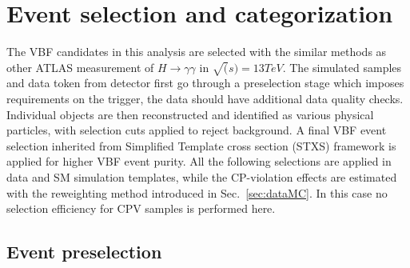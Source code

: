 \section{Event selection and categorization}
\label{sec:sel}

The VBF candidates in this analysis are selected with the similar methods as other ATLAS measurement of $H\to\gamma\gamma$ in $\sqrt(s)=13TeV$. The simulated samples and data token from detector first go through a preselection stage which imposes requirements on the trigger, the data should have additional data quality checks. Individual objects are then reconstructed and identified as various physical particles, with selection cuts applied to reject background. A final VBF event selection inherited from Simplified Template cross section (STXS) framework is applied for higher VBF event purity. All the following selections are applied in data and SM simulation templates, while the CP-violation effects are estimated with the reweighting method introduced in Sec.~\ref{sec:dataMC}. In this case no selection efficiency for CPV samples is performed here. 

\subsection{Event preselection}
\label{subsec:presel}

